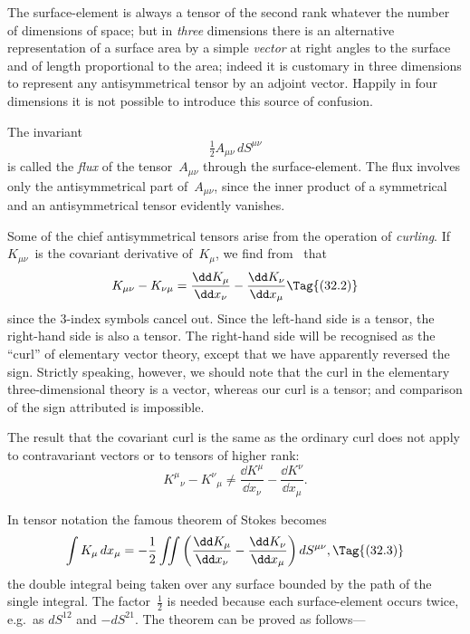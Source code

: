 \documentclass[12pt]{book}
\begin{document}
The surface\hyp{}element is always a tensor of the second rank whatever the
number of dimensions of space; but in \emph{three} dimensions there is an alternative
representation of a surface area by a simple \emph{vector} at right angles to the
surface and of length proportional to the area; indeed it is customary in three
dimensions to represent any antisymmetrical tensor by an adjoint vector.
Happily in four dimensions it is not possible to introduce this source of
confusion.

The invariant
\[
\tfrac{1}{2} A_{\mu\nu}\, dS^{\mu\nu}
\]
is called the \emph{flux} of the tensor~$A_{\mu\nu}$ through the surface\hyp{}element. The flux
%
involves only the antisymmetrical part of~$A_{\mu\nu}$, since the inner product of a
symmetrical and an antisymmetrical tensor evidently vanishes.

Some of the chief antisymmetrical tensors arise from the operation of
\emph{curling}. If $K_{\mu\nu}$~is the covariant derivative of~$K_{\mu}$, we find from~ that
\[
K_{\mu\nu} - K_{\nu\mu} = \frac{\dd K_{\mu}}{\dd x_{\nu}} - \frac{\dd K_{\nu}}{\dd x_{\mu}}
\Tag{(32.2)}
\]
since the $3$-index symbols cancel out. Since the left-hand side is a tensor, the
right-hand side is also a tensor. The right-hand side will be recognised as the
``curl'' of elementary vector theory, except that we have apparently reversed
%
the sign. Strictly speaking, however, we should note that the curl in the
elementary three\hyp{}dimensional theory is a vector, whereas our curl is a tensor;
and comparison of the sign attributed is impossible.

The result that the covariant curl is the same as the ordinary curl does
not apply to contravariant vectors or to tensors of higher rank:
\[
{K^{\mu}}_{\nu} - {K^{\nu}}_{\mu} \neq \frac{\dd K^{\mu}}{\dd x_{\nu}} - \frac{\dd K^{\nu}}{\dd x_{\mu}}.
\]

In tensor notation the famous theorem of Stokes becomes
%
\[
\int K_{\mu}\, dx_{\mu} = -\frac{1}{2} \iint \left(\frac{\dd K_{\mu}}{\dd x_{\nu}} - \frac{\dd K_{\nu}}{\dd x_{\mu}}\right) dS^{\mu\nu},
\Tag{(32.3)}
\]
the double integral being taken over any surface bounded by the path of the
single integral. The factor~$\frac{1}{2}$ is needed because each surface\hyp{}element occurs
twice, e.g.\ as $dS^{12}$ and $-dS^{21}$. The theorem can be proved as follows---
\end{document}
